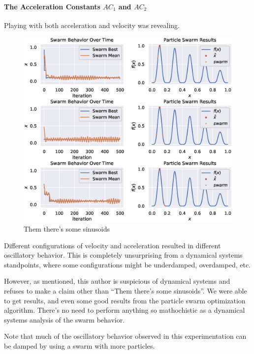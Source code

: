 \documentclass[12pt]{article}
\begin{document}
\paragraph{The Acceleration Constants $AC_1$ and $AC_2$} Playing with both acceleration and velocity was revealing.

\begin{figure}[H]
    \centering
    \includegraphics[width=\textwidth]{figures/pso/pso-sinusoids.eps}
    \caption{Them there's some sinusoids}\label{fig:pso:sinusoids}
\end{figure}

Different configurations of velocity and acceleration resulted in different oscillatory behavior.
This is completely unsurprising from a dynamical systems standpoints, where some configurations might be underdamped, overdamped, etc.

However, as mentioned, this author is suspicious of dynamical systems and refuses to make a claim other than ``Them there's some sinusoids''.
We were able to get results, and even some good results from the particle swarm optimization algorithm.
There's no need to perform anything so mathochistic as a dynamical systems analysis of the swarm behavior.

Note that much of the oscillatory behavior observed in this experimentation can be damped by using a swarm with more particles.
\end{document}
